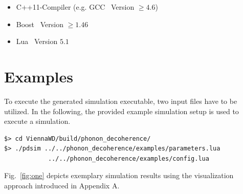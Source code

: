 \begin{itemize}
  \item C++11-Compiler (e.g. GCC~\cite{gcc} Version $\geq4.6$)
  \item Boost~\cite{boost} Version $\geq1.46$
  \item Lua~\cite{lua} Version $5.1$
\end{itemize}



\section{Examples} \label{wigner:examples}
To execute the generated simulation executable, two input files have to be utilized.
In the following, the provided example simulation setup is used to execute a simulation.

\begin{lstlisting}
$> cd ViennaWD/build/phonon_decoherence/
$> ./pdsim ../../phonon_decoherence/examples/parameters.lua
            ../../phonon_decoherence/examples/config.lua
\end{lstlisting}



Fig.~\ref{fig:one} depicts exemplary simulation results using the visualization approach introduced in Appendix A.

